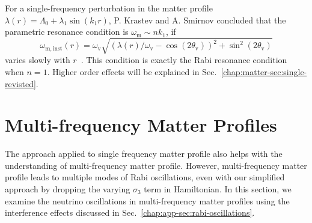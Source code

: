 

For a single-frequency perturbation in the matter profile $\lambda(r) =\Lambda_0 +  \lambda_1\sin(k_1 r)$, P. Krastev and A. Smirnov concluded that the parametric resonance condition is $\omega_{\mathrm{m}} \sim n k_1$, if
\begin{equation}
    \omega_{\mathrm{m,inst}}(r) = \omega_{\mathrm{v}} \sqrt{ ( \lambda(r)/\omega_{\mathrm{v}} - \cos (2\theta_{\mathrm{v}}) )^2 + \sin^2(2\theta_{\mathrm{v}}) }
\end{equation}
varies slowly with $r$~\cite{Krastev1989}. This condition is exactly the Rabi resonance condition when $n=1$. Higher order effects will be explained in Sec.~\ref{chap:matter-sec:single-revisted}.





\section{\label{chap:matter-sec:multiple-matter-frequencies}Multi-frequency Matter Profiles}


The approach applied to single frequency matter profile also helps with the understanding of multi-frequency matter profile. However, multi-frequency matter profile leads to multiple modes of Rabi oscillations, even with our simplified approach by dropping the varying $\sigma_3$ term in Hamiltonian. In this section, we examine the neutrino oscillations in multi-frequency matter profiles using the interference effects discussed in Sec.~\ref{chap:app-sec:rabi-oscillations}.



